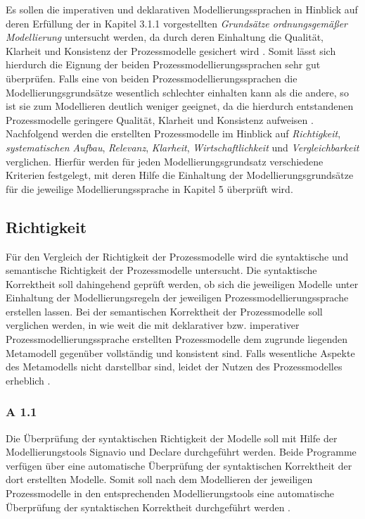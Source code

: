 Es sollen die imperativen und deklarativen Modellierungssprachen in Hinblick auf deren Erfüllung der in Kapitel 3.1.1 vorgestellten \textit{Grundsätze ordnungsgemäßer Modellierung} untersucht werden, da durch deren Einhaltung die Qualität, Klarheit und Konsistenz der Prozessmodelle gesichert wird \cite{freund2007}. Somit lässt sich hierdurch die Eignung der beiden Prozessmodellierungssprachen sehr gut überprüfen. Falls eine von beiden Prozessmodellierungssprachen die Modellierungsgrundsätze wesentlich schlechter einhalten kann als die andere, so ist sie zum Modellieren deutlich weniger geeignet, da die hierdurch entstandenen Prozessmodelle geringere Qualität, Klarheit und Konsistenz aufweisen \cite{freund2007}. Nachfolgend werden die erstellten Prozessmodelle im Hinblick auf \textit{Richtigkeit}, \textit{systematischen Aufbau}, \textit{Relevanz}, \textit{Klarheit}, \textit{Wirtschaftlichkeit} und \textit{Vergleichbarkeit} verglichen. Hierfür werden für jeden Modellierungsgrundsatz verschiedene Kriterien festgelegt, mit deren Hilfe die Einhaltung der Modellierungsgrundsätze für die jeweilige Modellierungssprache in Kapitel 5 überprüft wird. \newline

\subsection{Richtigkeit}
Für den Vergleich der Richtigkeit der Prozessmodelle wird die syntaktische und semantische Richtigkeit der Prozessmodelle untersucht. Die syntaktische Korrektheit soll dahingehend geprüft werden, ob sich die jeweiligen Modelle unter Einhaltung der Modellierungsregeln der jeweiligen Prozessmodellierungssprache erstellen lassen. Bei der semantischen Korrektheit der Prozessmodelle soll verglichen werden, in wie weit die mit deklarativer bzw. imperativer Prozessmodellierungssprache erstellten Prozessmodelle dem zugrunde liegenden Metamodell gegenüber vollständig und konsistent sind. Falls wesentliche Aspekte des Metamodells nicht darstellbar sind, leidet der Nutzen des Prozessmodelles erheblich \cite{journals95, freund2007, becker2012prozessmanagement,koch2011}.  \newline
\subsubsection{A 1.1}

Die Überprüfung der syntaktischen Richtigkeit der Modelle soll mit Hilfe der Modellierungstools Signavio und Declare durchgeführt werden. Beide Programme verfügen über eine automatische Überprüfung der syntaktischen Korrektheit der dort erstellten Modelle. Somit soll nach dem Modellieren der jeweiligen Prozessmodelle in den entsprechenden Modellierungstools eine automatische Überprüfung der syntaktischen Korrektheit durchgeführt werden \cite{journals95, becker2012prozessmanagement}. \newline
